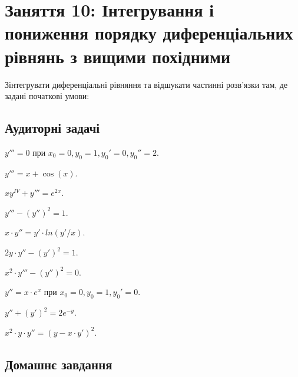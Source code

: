\section*{Заняття 10: Інтегрування і пониження порядку диференціальних рівнянь з вищими похідними}

Зінтегрувати диференціальні рівняння та відшукати частинні розв'язки там, де задані початкові умови:

\subsection*{Аудиторні задачі}

\begin{problem}
	$y''' = 0$ при $x_0 = 0, y_0 = 1, y_0' = 0, y_0''=2$.
\end{problem}

\begin{problem}
	$y''' = x + \cos (x)$.
\end{problem}

\begin{problem}
	$x y^{IV} + y''' = e^{2x}$.
\end{problem}

\begin{problem}
	$y''' - (y'')^2 = 1$.
\end{problem}

\begin{problem}
	$x \cdot y'' = y' \cdot ln (y' / x)$.
\end{problem}

\begin{problem}
	$2 y \cdot y'' - (y')^2 = 1$.
\end{problem}

\begin{problem}
	$x^2 \cdot y''' - (y'')^2 = 0$.
\end{problem}

\begin{problem}
	$y'' = x \cdot e^x$ при $x_0 = 0, y_0 = 1, y_0' = 0$.
\end{problem}

\begin{problem}
	$y'' + (y')^2 = 2 e^{-y}$.
\end{problem}

\begin{problem}
	$x^2 \cdot y \cdot y'' = (y - x \cdot y')^2$.
\end{problem}

\subsection*{Домашнє завдання}

